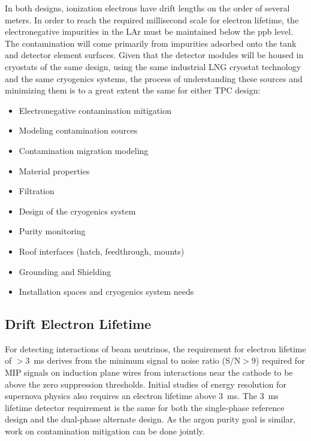 In both designs, ionization electrons have drift lengths on the order
of several meters. In order to reach the required millisecond scale for
electron lifetime, the electronegative impurities in the LAr must be
maintained below the ppb level. The contamination will
come primarily from impurities adsorbed onto the tank and detector element surfaces.
Given that the detector modules will be housed in cryostats of the same design,
using the same industrial LNG cryostat technology and the same cryogenics systems,
the process of understanding these sources and minimizing them
is to a great extent the same for either TPC design:
\begin{itemize}
\item Electronegative contamination mitigation	
\item Modeling contamination sources
\item Contamination migration modeling
\item Material properties
\item Filtration	
\item Design of the cryogenics system
\item Purity monitoring	
\item Roof interfaces (hatch, feedthrough, mounts)	
\item Grounding and Shielding
\item Installation spaces and cryogenics system needs	
\end{itemize}

\subsection{Drift Electron Lifetime} 
\label{sec:detectors-synergy-lifetime}


For detecting interactions of beam neutrinos, the requirement for
electron lifetime of $>$3~ms derives from the minimum signal to noise
ratio (S/N$>$9) required for MIP signals on induction plane wires from
interactions near the cathode to be above the zero suppression
thresholds.  Initial studies of energy resolution for supernova physics
also requires an electron lifetime above 3~ms.  The 3~ms lifetime
detector requirement is the same for both the single-phase reference
design and the dual-phase alternate design.  As the argon purity goal
is similar, work on contamination mitigation can be done jointly.

